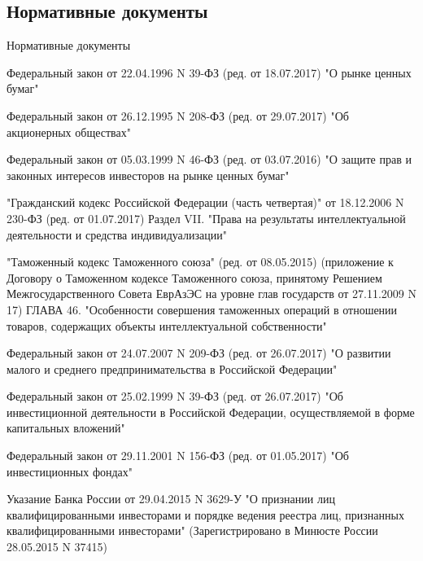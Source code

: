 \documentclass[_Venture_p1.tex]{subfiles}
\begin{document}
\subsection*{Нормативные документы}

\begin{frame}[allowframebreaks]{Нормативные документы}
  \begin{thebibliography}{10}
  
  \beamertemplatearticlebibitems
Федеральный закон от 22.04.1996 N 39-ФЗ (ред. от 18.07.2017) "О рынке ценных бумаг"

Федеральный закон от 26.12.1995 N 208-ФЗ (ред. от 29.07.2017) "Об акционерных обществах"

Федеральный закон от 05.03.1999 N 46-ФЗ (ред. от 03.07.2016) "О защите прав и законных интересов инвесторов на рынке ценных бумаг"

\pagebreak

"Гражданский кодекс Российской Федерации (часть четвертая)" от 18.12.2006 N 230-ФЗ (ред. от 01.07.2017) Раздел VII. "Права на результаты интеллектуальной деятельности и средства индивидуализации"

\pagebreak

"Таможенный кодекс Таможенного союза" (ред. от 08.05.2015) (приложение к Договору о Таможенном кодексе Таможенного союза, принятому Решением Межгосударственного Совета ЕврАзЭС на уровне глав государств от 27.11.2009 N 17) ГЛАВА 46. "Особенности совершения таможенных операций в отношении товаров, содержащих объекты интеллектуальной собственности"

\pagebreak

Федеральный закон от 24.07.2007 N 209-ФЗ (ред. от 26.07.2017) "О развитии малого и среднего предпринимательства в Российской Федерации"

Федеральный закон от 25.02.1999 N 39-ФЗ (ред. от 26.07.2017) "Об инвестиционной деятельности в Российской Федерации, осуществляемой в форме капитальных вложений"

\pagebreak

Федеральный закон от 29.11.2001 N 156-ФЗ (ред. от 01.05.2017) "Об инвестиционных фондах"


Указание Банка России от 29.04.2015 N 3629-У "О признании лиц квалифицированными инвесторами и порядке ведения реестра лиц, признанных квалифицированными инвесторами" (Зарегистрировано в Минюсте России 28.05.2015 N 37415)


\end{thebibliography}
\end{frame}
\end{document}
